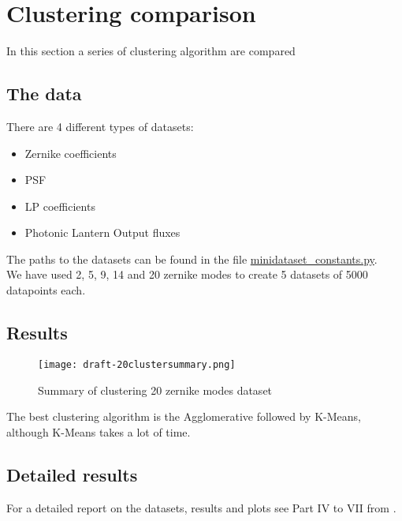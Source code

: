 \section{Clustering comparison}
	
	In this section a series of clustering algorithm are compared
	
	\subsection{The data}
	
		There are 4 different types of datasets:
		\begin{itemize}
			\item Zernike coefficients
			\item PSF
			\item LP coefficients
			\item Photonic Lantern Output fluxes
		\end{itemize}
		
		The paths to the datasets can be found in the file \href{https://github.com/Dacarpe03/PLImageReconstruction/blob/main/Utils/minidataset_constants.py}{minidataset\_constants.py}.\\
		
		We have used 2, 5, 9, 14 and 20 zernike modes to create 5 datasets of 5000 datapoints each.
		
	\subsection{Results}
		\begin{figure*}[ht!]
			\centering
			\texttt{[image: 
		draft-20clustersummary.png]}
			\caption{Summary of clustering 20 zernike modes dataset}
		\end{figure*}
		\FloatBarrier
		
		The best clustering algorithm is the Agglomerative followed by K-Means, although K-Means takes a lot of time.
		
	\subsection{Detailed results}
	
		For a detailed report on the datasets, results and plots see Part IV to VII from .